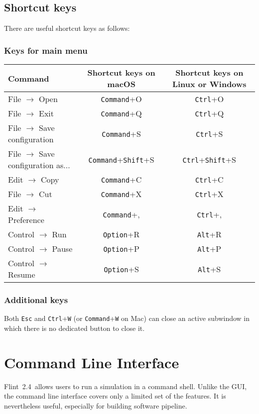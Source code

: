 \documentclass[a4paper,10pt]{report}
\def\FlintVersion{2.4}
\def\Flint{Flint~\FlintVersion}
\begin{document}
\section{Shortcut keys}
There are useful shortcut keys as follows:

\subsection{Keys for main menu}
\begin{tabular}{l||c|c}
  Command & Shortcut keys on macOS & Shortcut keys on Linux or Windows\\
  \hline
  File $\rightarrow$ Open & {\tt Command}+O & {\tt Ctrl}+O \\
  File $\rightarrow$ Exit & {\tt Command}+Q & {\tt Ctrl}+Q \\
  File $\rightarrow$ Save configuration & {\tt Command}+S & {\tt Ctrl}+S \\
  File $\rightarrow$ Save configuration as...& {\tt Command}+{\tt Shift}+S & {\tt Ctrl}+{\tt Shift}+S \\
  Edit $\rightarrow$ Copy & {\tt Command}+C & {\tt Ctrl}+C \\
  File $\rightarrow$ Cut  & {\tt Command}+X & {\tt Ctrl}+X \\
  Edit $\rightarrow$ Preference & {\tt Command}+, & {\tt Ctrl}+, \\
  Control $\rightarrow$ Run & {\tt Option}+R & {\tt Alt}+R \\
  Control $\rightarrow$ Pause & {\tt Option}+P & {\tt Alt}+P \\
  Control $\rightarrow$ Resume & {\tt Option}+S & {\tt Alt}+S \\
\end{tabular}

\subsection{Additional keys}
Both {\tt Esc} and {\tt Ctrl}+{\tt W} (or {\tt Command}+{\tt W} on Mac) can close an active
subwindow in which there is no dedicated button to close it.


\chapter{Command Line Interface}
\Flint\ allows users to run a simulation in a command shell.
Unlike the GUI, the command line interface covers only a limited set of
the features. It is nevertheless useful, especially for building software pipeline.
\end{document}
